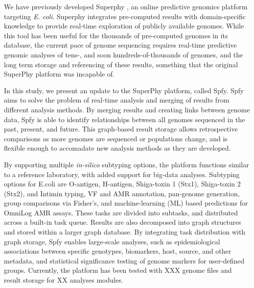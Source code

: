 \documentclass[a4,center,fleqn]{NAR}
\begin{document}
We have previously developed Superphy \cite{whiteside2016superphy}, an online predictive genomics platform targeting \textit{E. coli}. Superphy integrates pre-computed results with domain-specific knowledge to provide real-time exploration of publicly available genomes. While this tool has been useful for the thousands of pre-computed genomes in its database, the current pace of genome sequencing requires real-time predictive genomic analyses of tens-, and soon hundreds-of-thousands of genomes, and the long term storage and referencing of these results, something that the original SuperPhy platform was incapable of.


In this study, we present an update to the SuperPhy platform, called Spfy. Spfy aims to solve the problem of real-time analysis and merging of results from different analysis methods. By merging results and creating links between genome data, Spfy is able to identify relationships between all genomes sequenced in the past, present, and future. This graph-based result storage allows retrospective comparisons as more genomes are sequenced or populations change, and is flexible enough to accomadate new analysis methods as they are developed.


By supporting multiple \textit{in-silico} subtyping options, the platform functions similar to a reference laboratory, with added support for big-data analyses. Subtyping options for E.coli are O-antigen, H-antigen, Shiga-toxin 1 (Stx1), Shiga-toxin 2 (Stx2), and Intimin typing, VF and AMR annotation, pan-genome generation, group comparisons via Fisher's, and machine-learning (ML) based predictions for OmniLog AMR assays. These tasks are divided into subtasks, and distributed across a built-in task queue. Results are also decomposed into graph structures and stored within a larger graph database. By integrating task distribution with graph storage, Spfy enables large-scale analyses, such as epidemiological associations between specific genotypes, biomarkers, host, source, and other metadata, and statistical significance testing of genome markers for user-defined groups. Currently, the platform has been tested with XXX genome files and result storage for XX analyses modules.
\end{document}
